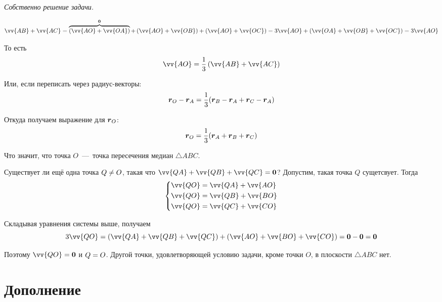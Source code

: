 \documentclass[a4paper,12pt]{article}
\begin{document}
\begin{solution}
    \medskip
    
    \emph{Собственно решение задачи.}
    
    \[
      \vv{AB} + \vv{AC}
      = \overbrace{\left(\vv{AO} + \vv{OA}\right)}^{\bds 0} + \left(\vv{AO} + \vv{OB}\right) + \left(\vv{AO} + \vv{OC}\right)
      = 3 \vv{AO} + \left(\vv{OA} + \vv{OB} + \vv{OC}\right)
      = 3 \vv{AO}
    \]
    
    То есть
    \[
      \vv{AO} = \frac{1}{3} \left(\vv{AB} + \vv{AC}\right)
    \]
    
    Или, если переписать через радиус-векторы:
    \[
      \boldsymbol r_O - \boldsymbol r_A = \frac{1}{3} (\boldsymbol r_B - \boldsymbol r_A + \boldsymbol r_C - \boldsymbol r_A)
    \]
    
    Откуда получаем выражение для $\boldsymbol r_O$:
    \[
      \boldsymbol r_O = \frac{1}{3} (\boldsymbol r_A + \boldsymbol r_B + \boldsymbol r_C)
    \]
    
    Что значит, что точка $O$~---~точка пересечения медиан $\triangle ABC$.
    
    Существует ли ещё одна точка $Q \hm{\not=} O$, такая что $\vv{QA} \hm+ \vv{QB} \hm+ \vv{QC} \hm= \bds 0$?
    Допустим, такая точка $Q$ сущетсвует.
    Тогда
    \[
      \left\{
        \begin{aligned}
          &\vv{QO} = \vv{QA} + \vv{AO}\\
          &\vv{QO} = \vv{QB} + \vv{BO}\\
          &\vv{QO} = \vv{QC} + \vv{CO}
        \end{aligned}
      \right.
    \]
    
    Складывая уравнения системы выше, получаем
    \[
      3 \vv{QO} = \left(\vv{QA} + \vv{QB} + \vv{QC}\right) + \left(\vv{AO} + \vv{BO} + \vv{CO}\right)
      = \bds 0 - \bds 0 = \bds 0
    \]
    
    Поэтому $\vv{QO} \hm= \bds 0$ и $Q \hm= O$.
    Другой точки, удовлетворяющей условию задачи, кроме точки $O$, в плоскости $\triangle ABC$ нет.
  \end{solution}
  
  
  
  
  
  
  
  \section{Дополнение}
  
\end{document}
